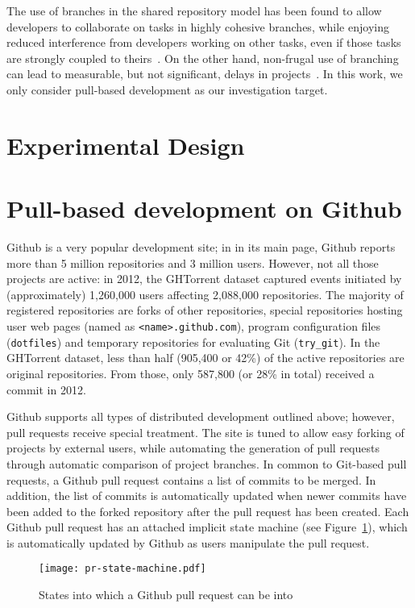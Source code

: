 \documentclass{sig-alternate}
\begin{document}
The use of branches in the shared repository model has been found to allow
developers to collaborate on tasks in highly cohesive branches, while enjoying
reduced interference from developers working on other tasks, even if those tasks
are strongly coupled to theirs~\cite{Barr12}. On the other hand, non-frugal
use of branching can lead to measurable, but not significant, delays in 
projects~\cite{Bird12}. In this work, we only consider pull-based development
as our investigation target.

\section{Experimental Design}

\section{Pull-based development on Github}

Github is a very popular development site; in in its main page, Github reports
more than 5 million repositories and 3 million users. However,  not all those
projects are active: in 2012, the GHTorrent dataset captured events initiated by
(approximately) 1,260,000 users affecting 2,088,000 repositories. The majority
of registered repositories are forks of other repositories, special repositories
hosting user web pages (named as \texttt{<name>.github.com}), program
configuration files (\texttt{dotfiles}) and temporary repositories for
evaluating Git (\texttt{try\_git}). In the GHTorrent dataset, less than half
(905,400 or 42\%) of the active repositories are original repositories. From
those, only 587,800 (or 28\% in total) received a commit in 2012.

Github supports all types of distributed development outlined above; however,
pull requests receive special treatment. The site is tuned to allow easy forking
of projects by external users, while automating the generation of pull
requests through automatic comparison of project branches. In common to
Git-based pull requests, a Github pull request contains a list of commits
to be merged. In addition, the list of commits is automatically updated when newer commits have been added to the forked repository after the pull request
has been created. Each Github pull request has an attached implicit state
machine (see Figure~\ref{fig:state}), which is automatically updated by
Github as users manipulate the pull request.

\begin{figure}
  \begin{center}
    \texttt{[image: pr-state-machine.pdf]}
  \end{center}
  \caption{States into which a Github pull request can be into}
  \label{fig:state}
\end{figure}
\end{document}
